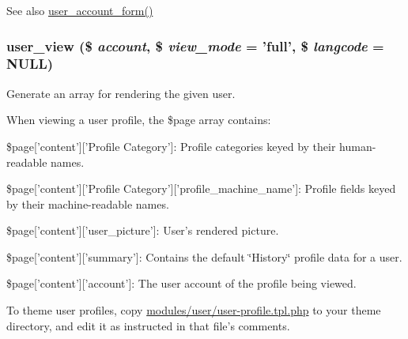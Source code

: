 \begin{DoxySeeAlso}{See also}
\hyperlink{user_8module_ab51965add9fd8ee2915e65d39213d05c}{user\_\-account\_\-form()} 
\end{DoxySeeAlso}
\hypertarget{user_8module_aa5b236a0e9e2aad7ff06f23bc5046914}{
\subsubsection[{user\_\-view}]{\setlength{\rightskip}{0pt plus 5cm}user\_\-view (\$ {\em account}, \/  \$ {\em view\_\-mode} = {\ttfamily 'full'}, \/  \$ {\em langcode} = {\ttfamily NULL})}}
\label{user_8module_aa5b236a0e9e2aad7ff06f23bc5046914}
Generate an array for rendering the given user.

When viewing a user profile, the \$page array contains:


\begin{DoxyItemize}
\item \$page\mbox{[}'content'\mbox{]}\mbox{[}'Profile Category'\mbox{]}: Profile categories keyed by their human-\/readable names.
\item \$page\mbox{[}'content'\mbox{]}\mbox{[}'Profile Category'\mbox{]}\mbox{[}'profile\_\-machine\_\-name'\mbox{]}: Profile fields keyed by their machine-\/readable names.
\item \$page\mbox{[}'content'\mbox{]}\mbox{[}'user\_\-picture'\mbox{]}: User's rendered picture.
\item \$page\mbox{[}'content'\mbox{]}\mbox{[}'summary'\mbox{]}: Contains the default \char`\"{}History\char`\"{} profile data for a user.
\item \$page\mbox{[}'content'\mbox{]}\mbox{[}'account'\mbox{]}: The user account of the profile being viewed.
\end{DoxyItemize}

To theme user profiles, copy \hyperlink{user-profile_8tpl_8php}{modules/user/user-\/profile.tpl.php} to your theme directory, and edit it as instructed in that file's comments.


